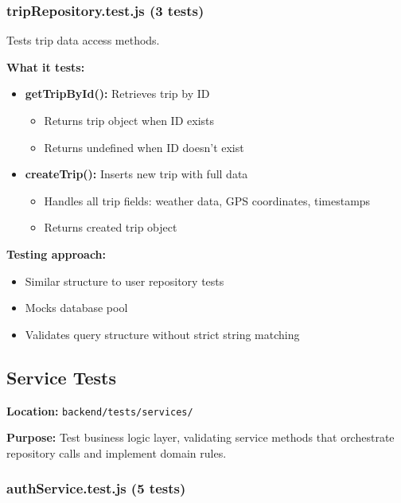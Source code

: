 \subsubsection{tripRepository.test.js (3 tests)}
\label{subsubsec:trip_repository_test}

Tests trip data access methods.

\textbf{What it tests:}
\begin{itemize}
    \item \textbf{getTripById():} Retrieves trip by ID
    \begin{itemize}
        \item Returns trip object when ID exists
        \item Returns undefined when ID doesn't exist
    \end{itemize}
    
    \item \textbf{createTrip():} Inserts new trip with full data
    \begin{itemize}
        \item Handles all trip fields: weather data, GPS coordinates, timestamps
        \item Returns created trip object
    \end{itemize}
\end{itemize}

\textbf{Testing approach:}
\begin{itemize}
    \item Similar structure to user repository tests
    \item Mocks database pool
    \item Validates query structure without strict string matching
\end{itemize}

\subsection{Service Tests}
\label{subsec:service_tests}

\textbf{Location:} \texttt{backend/tests/services/}

\textbf{Purpose:} Test business logic layer, validating service methods that orchestrate repository calls and implement domain rules.

\subsubsection{authService.test.js (5 tests)}
\label{subsubsec:auth_service_test}


